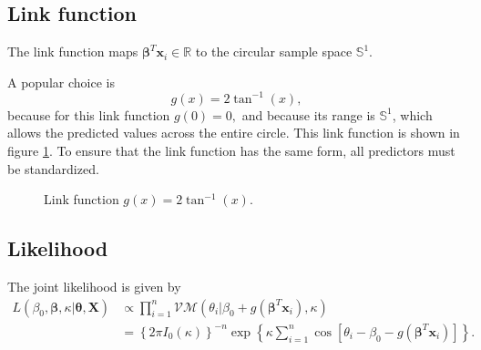\documentclass[12pt,a4paper]{article}\usepackage[]{graphicx}\usepackage[]{color}
\begin{document}
\subsection{Link function}

The link function maps $\boldsymbol\beta^T \boldsymbol{x}_i \in \mathbb{R}$ to the circular sample space $\mathbb{S}^1$.

A popular choice is
\begin{equation}
g(x) = 2 \tan^{-1}(x),
\end{equation} because for this link function $g(0) = 0,$ and because its range is $\mathbb{S}^1$, which allows the predicted values across the entire circle. This link function is shown in figure \ref{linkfunc}. To ensure that the link function has the same form, all predictors must be standardized. %

\begin{figure}
\caption{Link function $g(x) = 2 \tan^{-1}(x).$}
\label{linkfunc}
\end{figure}

\subsection{Likelihood}

The joint likelihood is given by
\begin{align}
L(\beta_0, \boldsymbol{\beta}, \kappa \vert \boldsymbol{\theta}, \boldsymbol{X}) &\propto  \prod_{i=1}^{n} \mathcal{VM}(\theta_i \vert \beta_0 + g(\boldsymbol\beta^T \boldsymbol{x}_i), \kappa) \\
&=  \left\lbrace 2 \pi I_0(\kappa) \right\rbrace^{-n} \exp \left\lbrace \kappa \sum_{i=1}^{n} \cos \left[ \theta_i - \beta_0 - g(\boldsymbol\beta^T \boldsymbol{x}_i) \right]  \right\rbrace.
\end{align}

\end{document}
